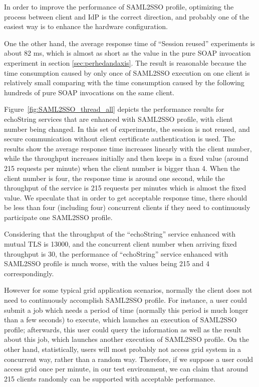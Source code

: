 \documentclass[conference]{IEEEtran}
\begin{document}
In order to improve the performance of SAML2SSO profile, optimizing the process
between client and IdP is the correct direction, and probably one of the easiest way is
to enhance the hardware configuration.

One the other hand, the average response time of ``Session reused'' experiments
is about 82 ms, which is almost as short as the value in the pure SOAP invocation experiment in
section \ref{sec:perhedandaxis}. The result is reasonable because the time consumption
caused by only once of SAML2SSO execution on one client is relatively small comparing with
the time consumption caused by the following hundreds of pure SOAP invocations on the
same client.

Figure~\ref{fig:SAML2SSO_thread_all} depicts the performance results for
echoString services that are enhanced with SAML2SSO profile, with client number being changed. In
this set of experiments, the session is not reused, and secure communication without client certificate
authentication is used. The results show the average response time increases linearly with the client
number, while the throughput increases initially and then keeps in a fixed value (around 215
requests per minute) when the client number is bigger than 4. When the client number is four, the
response time is around one second, while the throughput of the service is 215 requests per
minutes which is almost the fixed value.
We speculate that in order to get acceptable response time, there should be less
than four (including four) concurrent clients if they need to continuously participate one SAML2SSO
profile. 

Considering that the throughput of the ``echoString'' service enhanced with mutual
TLS is 13000, and the concurrent client number when arriving fixed throughput is 30, the
performance of ``echoString'' service enhanced with SAML2SSO profile is much worse, with the
values being 215 and 4 correspondingly.

However for some typical grid application scenarios, normally the client does
not need to continuously accomplish SAML2SSO profile. For instance, a user could submit a
job which needs a period of time (normally this period is much longer than a few
seconds) to execute, which launches an execution of SAML2SSO profile; 
afterwards, this user could query the information as well as the result about
this job, which launches another execution of SAML2SSO profile. On the other hand,
statistically, users will most probably not access grid system in a concurrent way, rather than a random way.
Therefore, if we suppose a user could access grid once per minute, in our test environment, we
can claim that around 215 clients randomly can be supported with acceptable performance.
\end{document}
